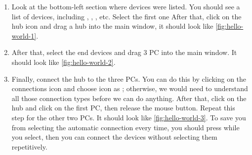 \begin{enumerate}
    \item Look at the bottom-left section where devices were listed. You should
          see a list of devices, including , ,
          , etc. Select the first one 
           After that, click
          on the hub icon  and drag a hub
          into the main window, it should look like \autoref{fig:hello-world-1}.
    \item After that, select the end devices
           and drag 3 PC
           into the main window. It should
          look like \autoref{fig:hello-world-2}.
    \item Finally, connect the hub to the three PCs. You can do this by clicking
          on the connections icon 
          and choose  icon as
          ; otherwise,
          we would need to understand all those connection types before we can
          do anything. After that, click on the hub and click on the first PC,
          then release the mouse button. Repeat this step for the other two PCs.
          It should look like \autoref{fig:hello-world-3}. To save you from
          selecting the automatic connection every time, you should press
           while you select, then you can connect the devices without
          selecting them repetitively.
\end{enumerate}

